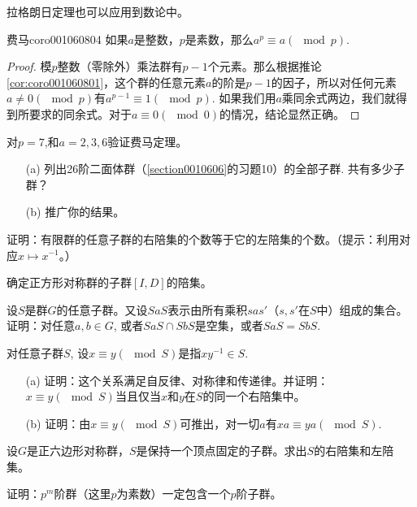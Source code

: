 拉格朗日定理也可以应用到数论中。
\begin{corollary}{费马}{coro001060804}
如果$a$是整数，$p$是素数，那么$a^p \equiv a(\mod{p})$.
\end{corollary}

\begin{proof}
模$p$整数（零除外）乘法群有$p-1$个元素。那么根据推论\ref{cor:coro001060801}，这个群的任意元素$a$的阶是$p-1$的因子，所以对任何元素$a \neq 0(\mod{p})$有$a^{p-1}\equiv 1(\mod{p})$. 如果我们用$a$乘同余式两边，我们就得到所要求的同余式。对于$a \equiv 0(\mod{0})$的情况，结论显然正确。
\end{proof}

\begin{problemset}
\item 对$p=7$,和$a=2,3,6$验证费马定理。

\item \begin{enumerate}
\item[(a)] 列出26阶二面体群（\ref{section0010606}的习题10）的全部子群. 共有多少子群？
\item[(b)] 推广你的结果。 
\end{enumerate}

\item 证明：有限群的任意子群的右陪集的个数等于它的左陪集的个数。（提示：利用对应$x \mapsto x^{-1}$。）

\item 确定正方形对称群的子群$[I, D]$的陪集。

\item 设$S$是群$G$的任意子群。又设$SaS$表示由所有乘积$sas'$（$s,s'$在$S$中）组成的集合。证明：对任意$a, b \in G$, 或者$SaS \cap SbS$是空集，或者$SaS = SbS$.

\item 对任意子群$S$, 设$x \equiv y(\mod{S})$是指$xy^{-1} \in S$.
\begin{enumerate}
\item[(a)] 证明：这个关系满足自反律、对称律和传递律。并证明：$x \equiv y(\mod{S})$当且仅当$x$和$y$在$S$的同一个右陪集中。
\item[(b)] 证明：由$x \equiv y(\mod{S})$可推出，对一切$a$有$xa \equiv ya(\mod{S})$.
\end{enumerate}

\item 设$G$是正六边形对称群，$S$是保持一个顶点固定的子群。求出$S$的右陪集和左陪集。

\item 证明：$p^m$阶群（这里$p$为素数）一定包含一个$p$阶子群。


\end{problemset}
